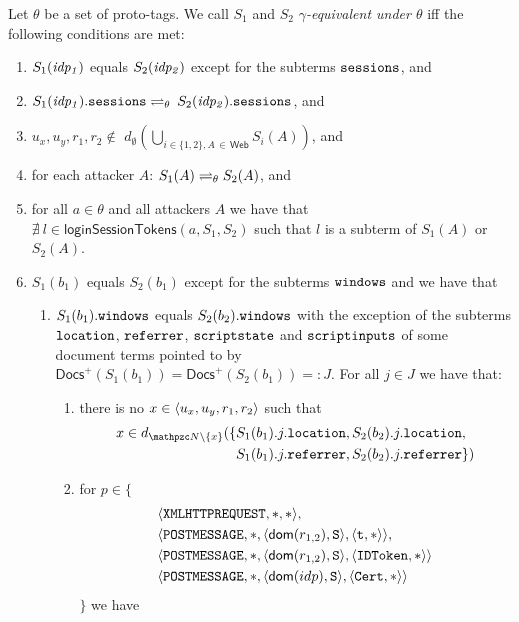   \begin{definition}\label{def:rp:eq-of-states}
    Let $\theta$ be a set of proto-tags. %
    We call $S_1$ and $S_2$ \emph{$\gamma$-equivalent under 
    $\theta$} iff the following conditions are met:
    \begin{enumerate}
    \item\label{eqs:rp:idp} 
      $S_1(\mathit{idp_1})$ equals $S_2(\mathit{idp_2})$ except
      for the subterms $\mathtt{sessions}$, and
    \item\label{eqs:rp:idp-sessions} 
      $S_1(\mathit{idp_1}).\mathtt{sessions} \rightleftharpoons_{\theta}$ 
      $S_2(\mathit{idp_2}).\mathtt{sessions}$, and
    \item\label{eqs:rp:att-unknown}
      $u_x, u_y, r_1, r_2 \not\in $
      $d_\emptyset(\bigcup_{i\in\{1,2\},A\,\in\,\mathsf{Web}}S_i(A))$, and
    \item\label{eqs:rp:att} 
      for each attacker $A$:
      $S_1(A) \rightleftharpoons_{\theta} S_2(A)$, and
    \item\label{eqs:rp:att-not-l} 
      for all $a\in\theta$ and all attackers $A$ we have that
      $\nexists\ l \in \mathsf{loginSessionTokens}(a,S_1,S_2)$ 
      such that $l$ is a subterm of $S_1(A)$ or $S_2(A)$.
    \item\label{eqs:rp:b} 
      $S_1(b_1)$ equals $S_2(b_1)$ except for the subterms 
      $\mathtt{windows}$ and we have that
      \begin{enumerate}
      \item\label{eqs:rp:b:w}
        $S_1(b_1).\mathtt{windows}$ equals $S_2(b_2).\mathtt{windows}$ 
        with the exception of the subterms $\mathtt{location}$, $\mathtt{referrer}$, $\mathtt{scriptstate}$ 
        and $\mathtt{scriptinputs}$ of some document terms pointed 
        to by $\mathsf{Docs}^+(S_1(b_1)) = \mathsf{Docs}^+(S_2(b_1)) =: J$. 
        For all $j \in J$ we have that: 
        \begin{enumerate}
        \item there is no $x\in\langle {{}u_x, u_y, r_1, r_2} \rangle$ such that
          \begin{align*}
            x \in d_{\nonces \setminus \{x\}}(\{&S_1(b_1).j.\str{location}
            ,  S_2(b_2).j.\str{location},\\ & S_1(b_1).j.\str{referrer} , 
            S_2(b_2).j.\str{referrer}\})
          \end{align*}
        \item for $p \in \{$
          \begin{align*}
            & \langle\mathtt{XMLHTTPREQUEST},*,*\rangle,\\
            & \langle\mathtt{POSTMESSAGE},*,\langle\mathsf{dom}(r_{1,2}), \mathtt{S}\rangle,\langle\mathtt{t}, *\rangle\rangle,\\
            & \langle\mathtt{POSTMESSAGE},*,\langle\mathsf{dom}(r_{1,2}), \mathtt{S}\rangle,\langle\mathtt{IDToken}, *\rangle\rangle\\
            & \langle\mathtt{POSTMESSAGE},*,\langle\mathsf{dom}(idp), \mathtt{S}\rangle,\langle\mathtt{Cert}, *\rangle\rangle
          \end{align*}
          $\}$ we have


\end{enumerate}
\end{enumerate}
\end{enumerate}
\end{definition}
